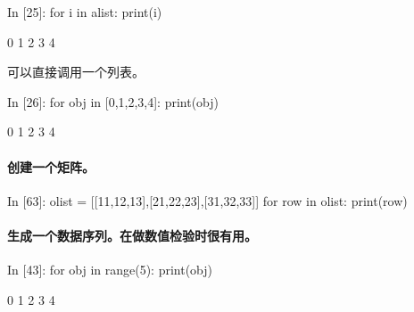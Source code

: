 \documentclass[letterpaper,10pt,english]{sphinxmanual}
\begin{document}
\begin{OriginalVerbatim}[commandchars=\\\{\}]
\textcolor{nbsphinxin}{In [25]: }for i in alist:
             print(i)
\end{OriginalVerbatim}
\begin{OriginalVerbatim}[commandchars=\\\{\}]
0
1
2
3
4
\end{OriginalVerbatim}
可以直接调用一个列表。

\begin{OriginalVerbatim}[commandchars=\\\{\}]
\textcolor{nbsphinxin}{In [26]: }for obj in [0,1,2,3,4]:
             print(obj)
\end{OriginalVerbatim}
\begin{OriginalVerbatim}[commandchars=\\\{\}]
0
1
2
3
4
\end{OriginalVerbatim}

\paragraph{创建一个矩阵。}
\label{pystart_databasic:_u521b_u5efa_u4e00_u4e2a_u77e9_u9635_u3002}
\begin{OriginalVerbatim}[commandchars=\\\{\}]
\textcolor{nbsphinxin}{In [63]: }olist = [[11,12,13],[21,22,23],[31,32,33]]
         for row in olist:
             print(row)
\end{OriginalVerbatim}
\begin{OriginalVerbatim}[commandchars=\\\{\}]
[11, 12, 13]
[21, 22, 23]
[31, 32, 33]
\end{OriginalVerbatim}

\paragraph{生成一个数据序列。在做数值检验时很有用。}
\label{pystart_databasic:_u751f_u6210_u4e00_u4e2a_u6570_u636e_u5e8f_u5217_u3002_u5728_u505a_u6570_u503c_u68c0_u9a8c_u65f6_u5f88_u6709_u7528_u3002}
\begin{OriginalVerbatim}[commandchars=\\\{\}]
\textcolor{nbsphinxin}{In [43]: }for obj in range(5):
             print(obj)
\end{OriginalVerbatim}
\begin{OriginalVerbatim}[commandchars=\\\{\}]
0
1
2
3
4
\end{OriginalVerbatim}
\end{document}
